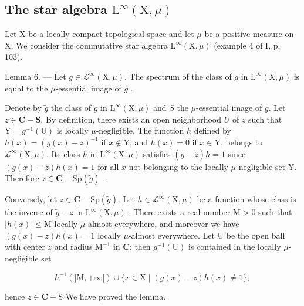 \subsection{\texorpdfstring{The star algebra \(\mathrm{L}^{\infty}(\mathrm{X},\mu)\)}{The star algebra \textbackslash mathrm\{L\}\^{}\{\textbackslash infty\}(\textbackslash mathrm\{X\},\textbackslash mu)}}

Let X be a locally compact topological space and let \(\mu\) be a positive measure on X. We consider the commutative star algebra \(\mathrm{L}^{\infty}(\mathrm{X},\mu)\) (example 4 of I, p. 103).

Lemma 6. --- Let \(g \in \mathcal{L}^{\infty}(\mathrm{X}, \mu)\). The spectrum of the class of \(g\) in \(\mathrm{L}^{\infty}(\mathrm{X}, \mu)\) is equal to the \(\mu\)-essential image of \(g\) .

Denote by \(\widetilde{g}\) the class of \(g\) in \(\mathrm{L}^{\infty}(\mathrm{X},\mu)\) and \(S\) the \(\mu\)-essential image of \(g\). Let \(z\in \mathbf{C} - \mathbf{S}\). By definition, there exists an open neighborhood \(U\) of \(z\) such that \(\mathrm{Y} = g^{-1}(\mathrm{U})\) is locally \(\mu\)-negligible. The function \(h\) defined by \(h(x) = (g(x) - z)^{-1}\) if \(x\notin \mathrm{Y}\), and \(h(x) = 0\) if \(x\in \mathrm{Y}\), belongs to \(\mathcal{L}^{\infty}(\mathrm{X},\mu)\). Its class \(\widetilde{h}\) in \(\mathrm{L}^{\infty}(\mathrm{X},\mu)\) satisfies \((\widetilde{g} -z)\widetilde{h} = 1\) since \((g(x) - z)h(x) = 1\) for all \(x\) not belonging to the locally \(\mu\)-negligible set Y. Therefore \(z\in \mathbf{C} - \mathrm{Sp}(\widetilde{g})\) .

Conversely, let \(z \in \mathbf{C} - \mathrm{Sp}(\widetilde{g})\). Let \(h \in \mathcal{L}^{\infty}(\mathrm{X},\mu)\) be a function whose class is the inverse of \(\widetilde{g} - z\) in \(\mathrm{L}^{\infty}(\mathrm{X},\mu)\) . There exists a real number \(\mathrm{M} > 0\) such that \(|h(x)| \leqslant \mathrm{M}\) locally \(\mu\)-almost everywhere, and moreover we have \((g(x) - z)h(x) = 1\) locally \(\mu\)-almost everywhere. Let U be the open ball with center \(z\) and radius \(\mathrm{M}^{-1}\) in \(\mathbf{C}\); then \(g^{-1}(\mathrm{U})\) is contained in the locally \(\mu\)-negligible set

\[
h ^ { - 1 } ( ] \mathrm{M} , + \infty [ ) \cup \{ x \in \mathrm{X} \mid ( g ( x ) - z ) h ( x ) \neq 1 \} ,
\]

hence \(z \in \mathbf{C} - \mathrm{S}\) We have proved the lemma.

